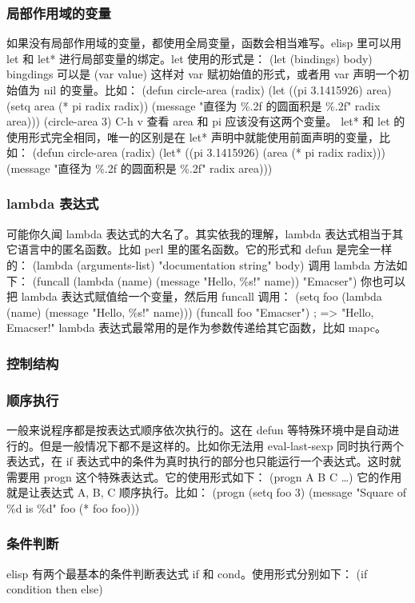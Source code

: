 \documentclass[11pt]{ctexart}
\begin{document}
{{{{\subsubsection{局部作用域的变量}
\label{sec:org3248962}
如果没有局部作用域的变量，都使用全局变量，函数会相当难写。elisp 里可以用 let 和 let* 进行局部变量的绑定。let 使用的形式是：
(let (bindings)
body)
bingdings 可以是 (var value) 这样对 var 赋初始值的形式，或者用 var 声明一个初始值为 nil 的变量。比如：
(defun circle-area (radix)
(let ((pi 3.1415926)
area)
(setq area (* pi radix radix))
(message "直径为 \%.2f 的圆面积是 \%.2f" radix area)))
(circle-area 3)
C-h v 查看 area 和 pi 应该没有这两个变量。
let* 和 let 的使用形式完全相同，唯一的区别是在 let* 声明中就能使用前面声明的变量，比如：
(defun circle-area (radix)
(let* ((pi 3.1415926)
(area (* pi radix radix)))
(message "直径为 \%.2f 的圆面积是 \%.2f" radix area)))
\subsubsection{lambda 表达式}
\label{sec:org3147457}
可能你久闻 lambda 表达式的大名了。其实依我的理解，lambda 表达式相当于其它语言中的匿名函数。比如 perl 里的匿名函数。它的形式和 defun 是完全一样的：
(lambda (arguments-list)
"documentation string"
body)
调用 lambda 方法如下：
(funcall (lambda (name)
(message "Hello, \%s!" name)) "Emacser")
你也可以把 lambda 表达式赋值给一个变量，然后用 funcall 调用：
(setq foo (lambda (name)
(message "Hello, \%s!" name)))
(funcall foo "Emacser")                   ; => "Hello, Emacser!"
lambda 表达式最常用的是作为参数传递给其它函数，比如 mapc。
\subsubsection{控制结构}
\label{sec:orgded0ba4}
\subsubsection{顺序执行}
\label{sec:org9819b64}
一般来说程序都是按表达式顺序依次执行的。这在 defun 等特殊环境中是自动进行的。但是一般情况下都不是这样的。比如你无法用 eval-last-sexp 同时执行两个表达式，在 if 表达式中的条件为真时执行的部分也只能运行一个表达式。这时就需要用 progn 这个特殊表达式。它的使用形式如下：
(progn A B C \ldots{})
它的作用就是让表达式 A, B, C 顺序执行。比如：
(progn
(setq foo 3)
(message "Square of \%d is \%d" foo (* foo foo)))
\subsubsection{条件判断}
\label{sec:org3edb155}
elisp 有两个最基本的条件判断表达式 if 和 cond。使用形式分别如下：
(if condition
then
else)

}}}}
\end{document}
